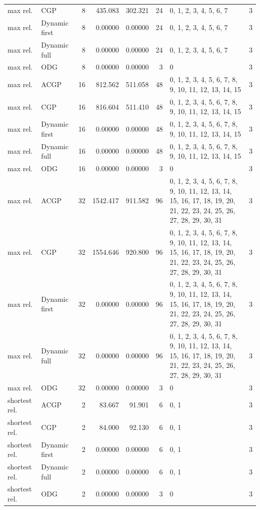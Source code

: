 \documentclass[10pt,a4paper]{article}
\begin{document}
\begin{longtable}{@{}p{23mm}p{29mm}rrrrp{36mm}r@{}}
max rel. & CGP & 8 & 435.083 & 302.321 & 24 & 0, 1, 2, 3, 4, 5, 6, 7 & 3 \\
max rel. & Dynamic first & 8 & 0.00000 & 0.00000 & 24 & 0, 1, 2, 3, 4, 5, 6, 7 & 3 \\
max rel. & Dynamic full & 8 & 0.00000 & 0.00000 & 24 & 0, 1, 2, 3, 4, 5, 6, 7 & 3 \\
max rel. & ODG & 8 & 0.00000 & 0.00000 & 3 & 0 & 3 \\
max rel. & ACGP & 16 & 812.562 & 511.058 & 48 & 0, 1, 2, 3, 4, 5, 6, 7, 8, 9, 10, 11, 12, 13, 14, 15 & 3 \\
max rel. & CGP & 16 & 816.604 & 511.410 & 48 & 0, 1, 2, 3, 4, 5, 6, 7, 8, 9, 10, 11, 12, 13, 14, 15 & 3 \\
max rel. & Dynamic first & 16 & 0.00000 & 0.00000 & 48 & 0, 1, 2, 3, 4, 5, 6, 7, 8, 9, 10, 11, 12, 13, 14, 15 & 3 \\
max rel. & Dynamic full & 16 & 0.00000 & 0.00000 & 48 & 0, 1, 2, 3, 4, 5, 6, 7, 8, 9, 10, 11, 12, 13, 14, 15 & 3 \\
max rel. & ODG & 16 & 0.00000 & 0.00000 & 3 & 0 & 3 \\
max rel. & ACGP & 32 & 1542.417 & 911.582 & 96 & 0, 1, 2, 3, 4, 5, 6, 7, 8, 9, 10, 11, 12, 13, 14, 15, 16, 17, 18, 19, 20, 21, 22, 23, 24, 25, 26, 27, 28, 29, 30, 31 & 3 \\
max rel. & CGP & 32 & 1554.646 & 920.800 & 96 & 0, 1, 2, 3, 4, 5, 6, 7, 8, 9, 10, 11, 12, 13, 14, 15, 16, 17, 18, 19, 20, 21, 22, 23, 24, 25, 26, 27, 28, 29, 30, 31 & 3 \\
max rel. & Dynamic first & 32 & 0.00000 & 0.00000 & 96 & 0, 1, 2, 3, 4, 5, 6, 7, 8, 9, 10, 11, 12, 13, 14, 15, 16, 17, 18, 19, 20, 21, 22, 23, 24, 25, 26, 27, 28, 29, 30, 31 & 3 \\
max rel. & Dynamic full & 32 & 0.00000 & 0.00000 & 96 & 0, 1, 2, 3, 4, 5, 6, 7, 8, 9, 10, 11, 12, 13, 14, 15, 16, 17, 18, 19, 20, 21, 22, 23, 24, 25, 26, 27, 28, 29, 30, 31 & 3 \\
max rel. & ODG & 32 & 0.00000 & 0.00000 & 3 & 0 & 3 \\
shortest rel. & ACGP & 2 & 83.667 & 91.901 & 6 & 0, 1 & 3 \\
shortest rel. & CGP & 2 & 84.000 & 92.130 & 6 & 0, 1 & 3 \\
shortest rel. & Dynamic first & 2 & 0.00000 & 0.00000 & 6 & 0, 1 & 3 \\
shortest rel. & Dynamic full & 2 & 0.00000 & 0.00000 & 6 & 0, 1 & 3 \\
shortest rel. & ODG & 2 & 0.00000 & 0.00000 & 3 & 0 & 3 \\

\end{longtable}
\end{document}
